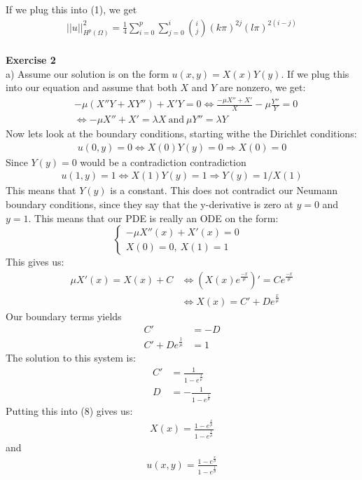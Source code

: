 \documentclass[11pt,a4paper]{report}
\begin{document}
If we plug this into (1), we get
\begin{gather}
||u||_{H^p(\Omega)}^2 = \frac{1}{4}\sum_{i=0}^p \sum_{j=0}^{i}\binom {i} {j}(k\pi)^{2j}(l\pi)^{2(i-j)}  
\end{gather}
\\
\textbf{Exercise 2}
\\
a) Assume our solution is on the form $u(x,y)=X(x)Y(y)$. If we plug this into our equation and assume that both $X$ and $Y$ are nonzero, we get:
\begin{align*}
&-\mu(X''Y+XY'') + X'Y = 0 \iff \frac{- \mu X''+X'}{X} - \mu\frac{Y''}{Y}=0 \\
&\iff - \mu X''+X'=\lambda X \ \text{and} \ \mu Y'' = \lambda Y
\end{align*} 
Now lets look at the boundary conditions, starting withe the Dirichlet conditions:
\begin{align*}
u(0,y)=0 \iff X(0)Y(y)=0 \Rightarrow X(0)=0 
\end{align*}
Since $Y(y)=0$ would be a contradiction contradiction
\begin{align*}
u(1,y)=1 \iff X(1)Y(y)=1 \Rightarrow Y(y)=1/X(1)
\end{align*} 
This means that $Y(y)$ is a constant. This does not contradict our Neumann boundary conditions, since they say that the y-derivative is zero at $y=0$ and $y=1$. This means that our PDE is really an ODE on the form:
\begin{displaymath}
   \left\{
     \begin{array}{lr}
       -\mu X''(x)+X'(x)= 0&   \\
       X(0)= 0, \ X(1)=1 &  
     \end{array}
   \right.
\end{displaymath}
This gives us: 
\begin{align}
\mu X'(x) = X(x) + C &\iff (X(x)e^{\frac{-x}{\mu}})'=Ce^{\frac{-x}{\mu}} \\
&\iff X(x) = C' + De^{\frac{x}{\mu}}
\end{align}
Our boundary terms yields
\begin{align*}
C'&=-D\\
C'+De^{\frac{1}{\mu}}&=1
\end{align*}
The solution to this system is:
\begin{align*}
C'&=\frac{1}{1-e^{\frac{1}{\mu}}} \\
D&=-\frac{1}{1-e^{\frac{1}{\mu}}}
\end{align*}
Putting this into (8) gives us:
\begin{align*}
X(x)=\frac{1-e^{\frac{x}{\mu}}}{1-e^{\frac{1}{\mu}}}
\end{align*}
and 
\begin{align*}
u(x,y)=\frac{1-e^{\frac{x}{\mu}}}{1-e^{\frac{1}{\mu}}}
\end{align*}
\end{document}
